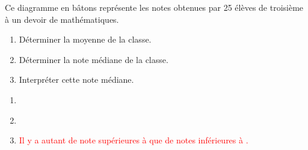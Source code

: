 \begin{exercice*}
    Ce diagramme en bâtons représente les notes obtenues par \num{25} élèves de troisième à un devoir de mathématiques.
    \par\smallskip
    \begin{enumerate}
        \item Déterminer la moyenne de la classe.
        \item Déterminer la note médiane de la classe.
        \item Interpréter cette note médiane.
    \end{enumerate}
\end{exercice*}
\begin{corrige}
    \begin{enumerate}
        \item \textcolor{red}{}
        \item \textcolor{red}{}
        \item \textcolor{red}{Il y a autant de note supérieures à {\Mediane} que de notes inférieures à \Mediane.}
    \end{enumerate}
\end{corrige}

